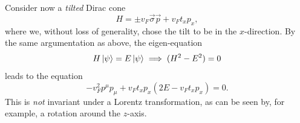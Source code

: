 Consider now a \emph{tilted} Dirac cone
\begin{equation}
  \label{eq:139}
  H = \pm v_F \vec{\sigma} \vec{p} + v_F t_x p_x,
\end{equation}
where we, without loss of generality, chose the tilt to be in the \( x \)-direction.
By the same argumentation as above, the eigen-equation
\[
  H \ket{\psi} = E\ket{\psi} \implies (H^2 - E^2) = 0
\]
leads to the equation
\begin{equation}
  \label{eq:140}
  -v_F^2 p^{\mu} p_{\mu} + v_{F} t_{x} p_x (2 E - v_F t_x p_x) = 0.
\end{equation}
This is \emph{not} invariant under a Lorentz transformation, as can be seen by, for example, a rotation around the \( z \)-axis.

